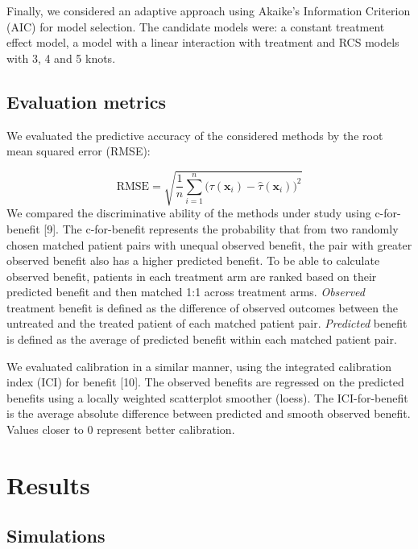 \documentclass[]{elsarticle} %
\begin{document}
Finally, we considered an adaptive approach using Akaike's Information
Criterion (AIC) for model selection. The candidate models were: a
constant treatment effect model, a model with a linear interaction with
treatment and RCS models with 3, 4 and 5 knots.

\hypertarget{evaluation-metrics}{%
\subsection{Evaluation metrics}\label{evaluation-metrics}}

We evaluated the predictive accuracy of the considered methods by the
root mean squared error (RMSE):

\[\text{RMSE}=\sqrt{\frac{1}{n}\sum_{i=1}^n\big(\tau(\bm{x}_i) - \hat{\tau}(\bm{x}_i)\big)^2}\]
We compared the discriminative ability of the methods under study using
c-for-benefit {[}9{]}. The c-for-benefit represents the probability that
from two randomly chosen matched patient pairs with unequal observed
benefit, the pair with greater observed benefit also has a higher
predicted benefit. To be able to calculate observed benefit, patients in
each treatment arm are ranked based on their predicted benefit and then
matched 1:1 across treatment arms. \emph{Observed} treatment benefit is
defined as the difference of observed outcomes between the untreated and
the treated patient of each matched patient pair. \emph{Predicted}
benefit is defined as the average of predicted benefit within each
matched patient pair.

We evaluated calibration in a similar manner, using the integrated
calibration index (ICI) for benefit {[}10{]}. The observed benefits are
regressed on the predicted benefits using a locally weighted scatterplot
smoother (loess). The ICI-for-benefit is the average absolute difference
between predicted and smooth observed benefit. Values closer to \(0\)
represent better calibration.

\hypertarget{results}{%
\section{Results}\label{results}}

\hypertarget{simulations}{%
\subsection{Simulations}\label{simulations}}
\end{document}
